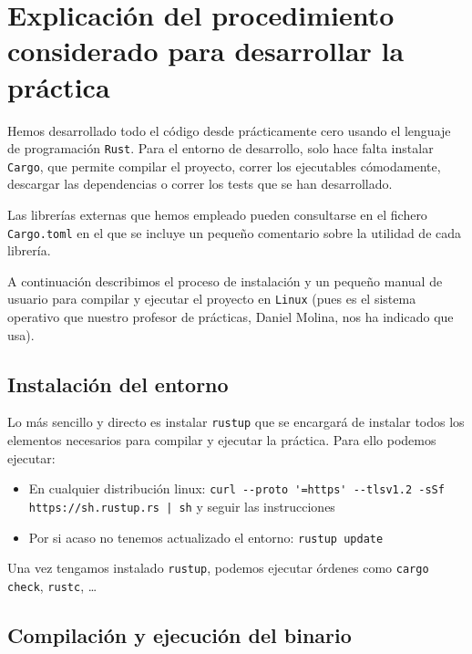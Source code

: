 \documentclass[11pt]{article}
\begin{document}
\section{Explicación del procedimiento considerado para desarrollar la práctica}

Hemos desarrollado todo el código desde prácticamente cero usando el lenguaje de programación \lstinline{Rust}. Para el entorno de desarrollo, solo hace falta instalar \lstinline{Cargo}, que permite compilar el proyecto, correr los ejecutables cómodamente, descargar las dependencias o correr los tests que se han desarrollado.

Las librerías externas que hemos empleado pueden consultarse en el fichero \lstinline{Cargo.toml} en el que se incluye un pequeño comentario sobre la utilidad de cada librería.

A continuación describimos el proceso de instalación y un pequeño manual de usuario para compilar y ejecutar el proyecto en \lstinline{Linux} (pues es el sistema operativo que nuestro profesor de prácticas, Daniel Molina, nos ha indicado que usa).

\subsection{Instalación del entorno}

Lo más sencillo y directo es instalar \lstinline{rustup} \footnotemark que se encargará de instalar todos los elementos necesarios para compilar y ejecutar la práctica. Para ello podemos ejecutar:

\begin{itemize}
    \item En cualquier distribución linux: \lstinline{curl --proto '=https' --tlsv1.2 -sSf https://sh.rustup.rs | sh} y seguir las instrucciones
    \item Por si acaso no tenemos actualizado el entorno: \lstinline{rustup update}
\end{itemize}

Una vez tengamos instalado \lstinline{rustup}, podemos ejecutar órdenes como \lstinline{cargo check}, \lstinline{rustc}, \ldots


\subsection{Compilación y ejecución del binario}
\end{document}
